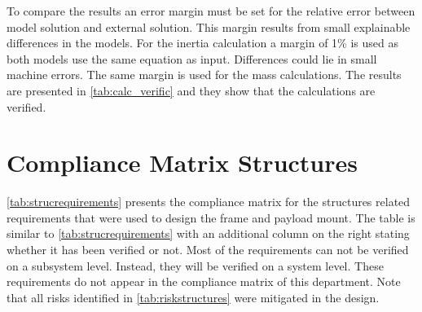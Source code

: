 To compare the results an error margin must be set for the relative error between model solution and external solution. This margin results from small explainable differences in the models. For the inertia calculation a margin of 1\% is used as both models use the same equation as input. Differences could lie in small machine errors. The same margin is used for the mass calculations.
The results are presented in \autoref{tab:calc_verific} and they show that the calculations are verified.

\begin{table}[h!]
\centering
\caption{Calculation verification of Tools}
\label{tab:calc_verific}
\end{table}









\section{Compliance Matrix Structures}
\label{sec:struccompliancematrix}
\autoref{tab:strucrequirements} presents the compliance matrix for the structures related requirements that were used to design the frame and payload mount. The table is similar to \autoref{tab:strucrequirements} with an additional column on the right stating whether it has been verified or not. Most of the requirements can not be verified on a subsystem level. Instead, they will be verified on a system level. These requirements do not appear in the compliance matrix of this department. Note that all risks identified in \autoref{tab:riskstructures} were mitigated in the design.

